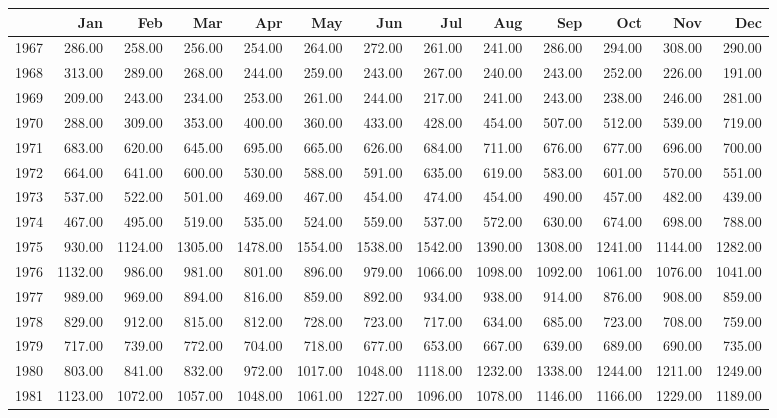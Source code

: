 \begin{longtable}{rrrrrrrrrrrrr}
  \hline
 & Jan & Feb & Mar & Apr & May & Jun & Jul & Aug & Sep & Oct & Nov & Dec \\ 
  \hline
1967 & 286.00 & 258.00 & 256.00 & 254.00 & 264.00 & 272.00 & 261.00 & 241.00 & 286.00 & 294.00 & 308.00 & 290.00 \\ 
  1968 & 313.00 & 289.00 & 268.00 & 244.00 & 259.00 & 243.00 & 267.00 & 240.00 & 243.00 & 252.00 & 226.00 & 191.00 \\ 
  1969 & 209.00 & 243.00 & 234.00 & 253.00 & 261.00 & 244.00 & 217.00 & 241.00 & 243.00 & 238.00 & 246.00 & 281.00 \\ 
  1970 & 288.00 & 309.00 & 353.00 & 400.00 & 360.00 & 433.00 & 428.00 & 454.00 & 507.00 & 512.00 & 539.00 & 719.00 \\ 
  1971 & 683.00 & 620.00 & 645.00 & 695.00 & 665.00 & 626.00 & 684.00 & 711.00 & 676.00 & 677.00 & 696.00 & 700.00 \\ 
  1972 & 664.00 & 641.00 & 600.00 & 530.00 & 588.00 & 591.00 & 635.00 & 619.00 & 583.00 & 601.00 & 570.00 & 551.00 \\ 
  1973 & 537.00 & 522.00 & 501.00 & 469.00 & 467.00 & 454.00 & 474.00 & 454.00 & 490.00 & 457.00 & 482.00 & 439.00 \\ 
  1974 & 467.00 & 495.00 & 519.00 & 535.00 & 524.00 & 559.00 & 537.00 & 572.00 & 630.00 & 674.00 & 698.00 & 788.00 \\ 
  1975 & 930.00 & 1124.00 & 1305.00 & 1478.00 & 1554.00 & 1538.00 & 1542.00 & 1390.00 & 1308.00 & 1241.00 & 1144.00 & 1282.00 \\ 
  1976 & 1132.00 & 986.00 & 981.00 & 801.00 & 896.00 & 979.00 & 1066.00 & 1098.00 & 1092.00 & 1061.00 & 1076.00 & 1041.00 \\ 
  1977 & 989.00 & 969.00 & 894.00 & 816.00 & 859.00 & 892.00 & 934.00 & 938.00 & 914.00 & 876.00 & 908.00 & 859.00 \\ 
  1978 & 829.00 & 912.00 & 815.00 & 812.00 & 728.00 & 723.00 & 717.00 & 634.00 & 685.00 & 723.00 & 708.00 & 759.00 \\ 
  1979 & 717.00 & 739.00 & 772.00 & 704.00 & 718.00 & 677.00 & 653.00 & 667.00 & 639.00 & 689.00 & 690.00 & 735.00 \\ 
  1980 & 803.00 & 841.00 & 832.00 & 972.00 & 1017.00 & 1048.00 & 1118.00 & 1232.00 & 1338.00 & 1244.00 & 1211.00 & 1249.00 \\ 
  1981 & 1123.00 & 1072.00 & 1057.00 & 1048.00 & 1061.00 & 1227.00 & 1096.00 & 1078.00 & 1146.00 & 1166.00 & 1229.00 & 1189.00 \\ 

\end{longtable}
